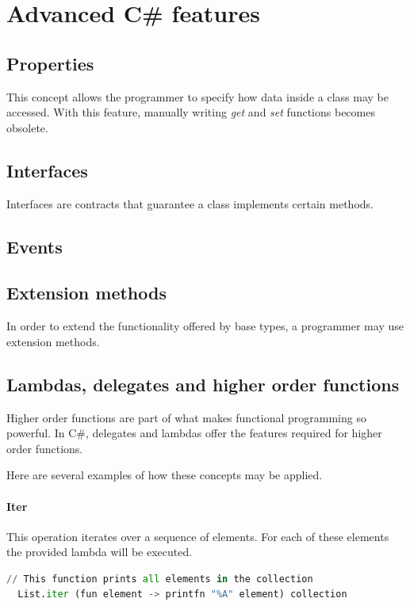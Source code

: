 \documentclass{article}
\begin{document}
\newpage

\section{Advanced C\# features}
\subsection{Properties}
This concept allows the programmer to specify how data inside a class may be accessed.
With this feature, manually writing {\em get} and {\em set} functions becomes obsolete.

\subsection{Interfaces}
Interfaces are contracts that guarantee a class implements certain methods.

\subsection{Events}


\subsection{Extension methods}
In order to extend the functionality offered by base types, a programmer may use extension methods.

\subsection{Lambdas, delegates and higher order functions}
Higher order functions are part of what makes functional programming so powerful.
In C\#, delegates and lambdas offer the features required for higher order functions.

Here are several examples of how these concepts may be applied.

\paragraph{Iter}
This operation iterates over a sequence of elements. For each of these elements the provided lambda will be executed.

\begin{lstlisting}[language=Python]
  // This function prints all elements in the collection
  List.iter (fun element -> printfn "%A" element) collection
\end{lstlisting}
\end{document}
